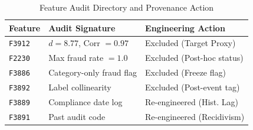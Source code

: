 \documentclass[conference]{IEEEtran}
\begin{document}
\begin{table}[h]
\centering
\caption{Feature Audit Directory and Provenance Action}
\label{tab:audit}
\footnotesize
\begin{tabularx}{\columnwidth}{l p{2.7cm} X}
\toprule
\textbf{Feature} & \textbf{Audit Signature} & \textbf{Engineering Action} \\ \midrule
\texttt{F3912} & $d = 8.77$, Corr $= 0.97$ & Excluded (Target Proxy) \\
\texttt{F2230} & Max fraud rate $= 1.0$ & Excluded (Post-hoc status) \\
\texttt{F3886} & Category-only fraud flag & Excluded (Freeze flag) \\
\texttt{F3892} & Label collinearity & Excluded (Post-event tag) \\
\texttt{F3889} & Compliance date log & Re-engineered (Hist. Lag) \\
\texttt{F3891} & Past audit code & Re-engineered (Recidivism) \\ \bottomrule
\end{tabularx}
\end{table}
\end{document}
